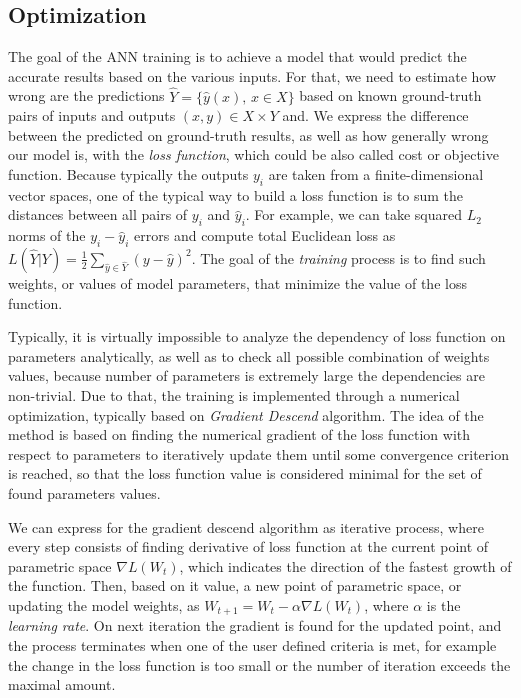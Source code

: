  


\subsection{Optimization}

The goal of the ANN training is to achieve a model that would predict the accurate results based on the various inputs.
For that, we need to estimate how wrong are the predictions $\hat{Y} = \{\hat{y}(x), \, x \in X \}$ based on known ground-truth pairs of inputs and outputs $ (x, y) \in X \times Y $ and.
We express the difference between the predicted on ground-truth results, as well as how generally wrong our model is, with the \textit{loss function}, which could be also called cost or objective function.
Because typically the outputs $y_{i}$ are taken from a finite-dimensional vector spaces, one of the typical way to build a loss function is to sum the distances between all pairs of $y_{i}$ and $\hat{y}_{i}$.
For example, we can take squared $L_{2}$ norms of the $y_{i}-\hat{y}_{i}$ errors and compute total Euclidean loss as $ L(\hat{Y}|Y) = \frac{1}{2}\sum_{\hat{y} \in \hat{Y}}(y - \hat{y})^{2} $.
The goal of the \textit{training} process is to find such weights, or values of model parameters, that minimize the value of the loss function.
\medskip

Typically, it is virtually impossible to analyze the dependency of loss function on parameters analytically, as well as to check all possible combination of weights values, because number of parameters is extremely large the dependencies are non-trivial. 
Due to that, the training is implemented through a numerical optimization, typically based on \textit{Gradient Descend} algorithm. 
The idea of the method is based on finding the numerical gradient of the loss function with respect to parameters to iteratively update them until some convergence criterion is reached, so that the loss function value is considered minimal for the set of found parameters values.
\medskip

We can express for the gradient descend algorithm as iterative process, where every step consists of finding derivative of loss function at the current point of parametric space $\nabla L(W_{t})$, which indicates the direction of the fastest growth of the function. 
Then, based on it value, a new point of parametric space, or updating the model weights, as $W_{t+1}=W_{t}-\alpha \nabla L(W_{t})$, where $\alpha$ is the \textit{learning rate}.
On next iteration the gradient is found for the updated point, and the process terminates when one of the user defined criteria is met, for example the change in the loss function is too small or the number of iteration exceeds the maximal amount.
\medskip

